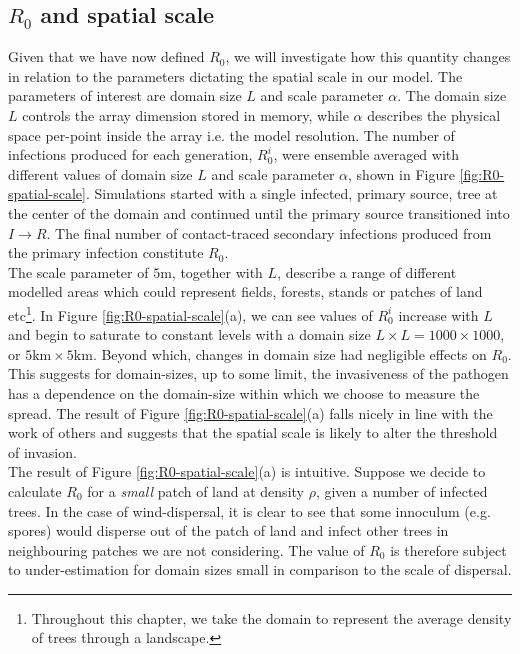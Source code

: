 \begin{fi}
\subsection{$R_0$ and spatial scale}

Given that we have now defined $R_0$, we will investigate how this quantity changes in relation %
to the parameters dictating the spatial scale in our model. %
The parameters of interest are domain size $L$ and scale parameter $\alpha$. %
The domain size $L$ controls the array dimension stored in  memory, while $\alpha$ %
describes the physical space per-point inside the array i.e. the model resolution. %
The number of infections produced for each generation, $R_0^i$, were ensemble averaged with %
different values of domain size $L$ and scale parameter $\alpha$, %
shown in Figure \ref{fig:R0-spatial-scale}. Simulations started with a single infected, %
primary source, tree at the center of the domain and continued until the primary source %
transitioned into $I\rightarrow R$. %
The final number of contact-traced secondary infections produced from the primary infection %
constitute $R_0$.\\

The scale parameter of $5\mathrm{m}$, together with $L$, describe a range of different modelled %
areas which could represent fields, forests, stands or patches of land etc\footnote{Throughout this chapter, %
we take the domain to represent the average density of trees through a landscape.}. %
In Figure \ref{fig:R0-spatial-scale}(a), we can see values of $R_0^i$ increase with $L$ and %
begin to saturate to constant levels with a domain size $L\times L=1000\times 1000$, or $5\mathrm{km}\times 5 \mathrm{km}$. %
Beyond which, changes in domain size had negligible effects on $R_0$. %
This suggests for domain-sizes, up to some limit, the invasiveness of the pathogen has a %
dependence on the domain-size within which we choose to measure the spread. %
The result of Figure \ref{fig:R0-spatial-scale}(a) falls nicely in line with the work of %
others \cite{mikaberidze2016invasiveness} and suggests that the spatial scale is likely to %
alter the threshold of invasion.\\

The result of Figure \ref{fig:R0-spatial-scale}(a) is intuitive. %
Suppose we decide to calculate $R_0$ for a \textit{small} patch of land at density $\rho$, %
given a number of infected trees. In the case of wind-dispersal, it is clear to see that some %
innoculum (e.g. spores) would disperse out of the patch of land and infect other trees in %
neighbouring patches we are not considering. The value of $R_0$ is therefore subject to %
under-estimation for domain sizes small in comparison to the scale of dispersal.\\ 


\end{fi}
